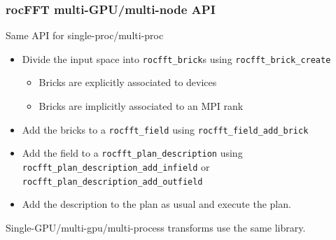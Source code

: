 \documentclass[10pt,aspectratio=169]{beamer}
\begin{document}
\begin{frame}
  \frametitle{rocFFT multi-GPU/multi-node API}

  \begin{center}
    Same API for single-proc/multi-proc
  \end{center}

  \bigskip
  
  \begin{itemize}
  \item Divide the input space into \lstinline{rocfft_brick}s using
    \lstinline{rocfft_brick_create}
    \begin{itemize}
    \item Bricks are explicitly associated to devices
    \item Bricks are implicitly associated to an MPI rank
    \end{itemize}
  \item Add the bricks to a \lstinline{rocfft_field} using
    \lstinline{rocfft_field_add_brick}
  \item Add the field to a \lstinline{rocfft_plan_description} using
    \lstinline{rocfft_plan_description_add_infield} or
    \lstinline{rocfft_plan_description_add_outfield}
  \item Add the description to the plan as usual and execute the plan.
  \end{itemize}
  
  \bigskip

  \begin{center}
    Single-GPU/multi-gpu/multi-process transforms use the same library.
  \end{center}
  
\end{frame}
\end{document}
